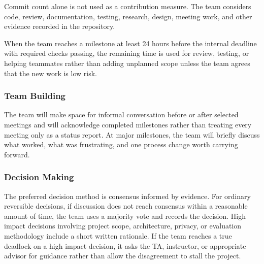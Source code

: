 \documentclass{article}
\begin{document}
Commit count alone is not used as a contribution measure. The team considers code, review, documentation, testing, research, design, meeting work, and other evidence recorded in the repository.

When the team reaches a milestone at least 24 hours before the internal deadline with required checks passing, the remaining time is used for review, testing, or helping teammates rather than adding unplanned scope unless the team agrees that the new work is low risk.

\subsubsection*{Team Building}

The team will make space for informal conversation before or after selected meetings and will acknowledge completed milestones rather than treating every meeting only as a status report. At major milestones, the team will briefly discuss what worked, what was frustrating, and one process change worth carrying forward.

\subsubsection*{Decision Making}

The preferred decision method is consensus informed by evidence. For ordinary reversible decisions, if discussion does not reach consensus within a reasonable amount of time, the team uses a majority vote and records the decision. High impact decisions involving project scope, architecture, privacy, or evaluation methodology include a short written rationale. If the team reaches a true deadlock on a high impact decision, it asks the TA, instructor, or appropriate advisor for guidance rather than allow the disagreement to stall the project.
\end{document}
